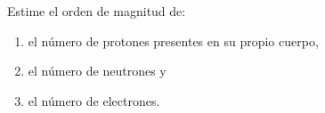 \item Estime el orden de magnitud de:
\begin{enumerate}
    \item el número de protones presentes en su propio cuerpo,
    \item el número de neutrones y
    \item el número de electrones.
\end{enumerate}
